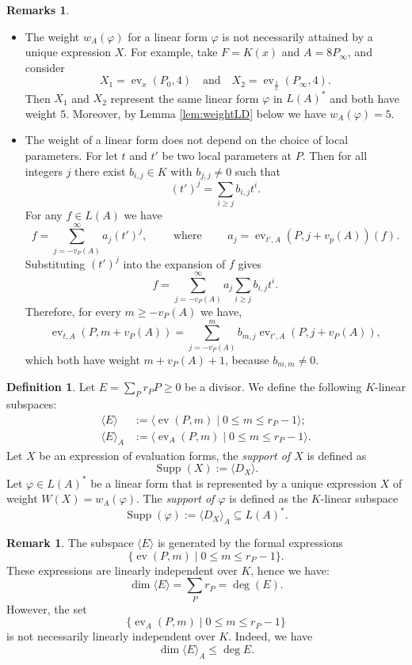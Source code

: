 \documentclass[12pt]{amsart}
\renewcommand{\geq}{\geqslant}
\DeclareMathOperator{\ev}{ev}
\DeclareMathOperator{\Supp}{Supp}
\theoremstyle{definition}
\newtheorem{definition}[theorem]{Definition}
\newtheorem{remark}[theorem]{Remark}
\newtheorem{remarks}[theorem]{Remarks}
\newcommand{\divi}[1]{\langle #1 \rangle}
\begin{document}
	\begin{remarks}\label{re:exweight}~
		\begin{itemize}
			\item The weight
			$w_A(\varphi)$ for a linear form $\varphi$ is not necessarily attained by a unique expression $X$. For example, take $F=K(x)$ and $A = 8P_\infty$, and consider 
			$$X_1= \ev_{x}(P_0,4)  \quad \text{and}\quad X_2= \ev_{\frac 1x}(P_\infty,4).$$ 
			Then $X_1$ and $X_2$ represent the same linear form $\varphi$ in $L(A)^\ast$ and both have weight $5$. Moreover, by Lemma \ref{lem:weightLD} below we have  $w_A(\varphi) = 5$.
			\item The weight of a linear form does not depend on the choice of local parameters. For let $t$ and $t'$ be two local parameters at $P$. 
			Then for all integers $j$ there exist $b_{i, j} \in K$ with $b_{j, j} \neq 0$ such that
			$$(t')^j=\sum_{i\geq j}b_{i, j}t^i.$$
			For any $f\in L(A)$ we have 
			$$f=\sum_{j=-v_P(A)}^{\infty}a_j(t')^j,\qquad\text{ where }\qquad a_j=\operatorname{ev}_{t', A}(P,j+v_p(A))(f).$$
			Substituting $(t')^j$ into the expansion of $f$ gives
			$$f=\sum_{j=-v_P(A)}^{\infty}a_j\sum_{i\geq j}b_{i,j}t^i.$$
			Therefore, for every $m \geq -v_P(A)$ we have,
			$$\operatorname{ev}_{t,A}(P,m + v_P(A))=
			\sum_{j=-v_P(A)}^{m}
			b_{m,j}\operatorname{ev}_{t',A}(P,j+v_P(A)),$$
			which both have weight $m + v_P(A) + 1$, because $b_{m, m} \neq 0$.  
		\end{itemize}
	\end{remarks}
	
	\begin{definition}
		Let $E=\sum_{P} r_P P \ge 0 $ be a divisor. We define the following $K$-linear subspaces:
		\begin{align*}
			\divi E &:= \langle  \ev (P, m) \mid  0 \le  m\le r_P-1  \rangle;\\
			\divi {E}_A &:= \langle  \ev_{A} (P, m) \mid   0\le m\le r_P-1  \rangle.    
		\end{align*}
		Let $X$ be an expression of evaluation forms, the \textit{support of $X$} is defined as
		$$ \Supp (X):= \divi{D_X}.$$
		Let $\varphi\in L(A)^*$ be a linear form that is represented by a unique expression $X$ of weight $W(X)= w_A(\varphi)$.
		The \textit{support of $\varphi$} is defined as the $K$-linear subspace
		$$ \Supp (\varphi):= \divi{D_X}_A \subseteq L(A)^\ast.$$
	\end{definition}
	
	
	\begin{remark}
		The subspace $\divi{E}$ is generated by the formal expressions 
		$$\{ \ev(P,m)\mid 0\le m\le r_P-1 \}. $$
		These expressions are linearly independent over $K$, hence we have: 
		$$  \dim \divi E = \sum_{P} r_P   =\deg (E).  $$
		However, the set
		$$\{ \ev_A(P,m)\mid 0\le m\le r_P-1 \} $$
		is not necessarily linearly independent over $K$. Indeed, we have 
		$$\dim \divi{E} _A \le \deg E .$$
	\end{remark}
	
\end{document}
